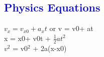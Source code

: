 \documentclass[reqno, 11pt]{amsart}
\providecommand{\blue}[1]{\textcolor{blue}{ #1}}
\begin{document}
\begin{center}

\section*{\blue{\bf Physics Equations
}}

\end{center}
\noindent
$v_x = v_{x0} + a_x t$
or
v = v\tiny{0}\normalsize + at
\\
x = x\tiny{0}\normalsize + v\tiny{0}\normalsize t + $\tfrac{1}{2} at^2$\\
$v^2$ = v\tiny{0}\normalsize$^2$ + 2a(x-x\tiny{0}\normalsize)
\end{document}
